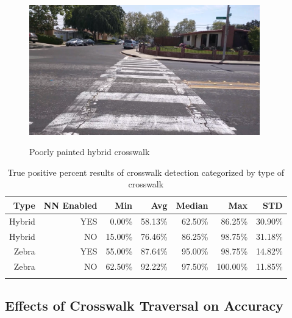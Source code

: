\documentclass[12pt]{ucthesis}
\newcommand{\captionfonts}{\small\bf\ssp}
\begin{document}
\begin{figure}[t]
\begin{center}
\includegraphics[width=10cm]{PoorlyPaintedHybrid.png}
\captionfonts
\caption[Poorly Painted Hybrid Crosswalk]{Poorly painted hybrid crosswalk}
\label{fig:poorlyPaintedHybrid}
\end{center}
\end{figure}

\clearpage

\begin{table}[t]
    \begin{longtable}{|r|r|r|r|r|r|r|}
    \hline
    Type & \multicolumn{1}{l|}{NN Enabled} & Min & Avg & Median & Max & STD \bigstrut\\
    \hline
    Hybrid & YES & 0.00\% & 58.13\% & 62.50\% & 86.25\% & 30.90\% \bigstrut\\
    \hline
    Hybrid & NO & 15.00\% & 76.46\% & 86.25\% & 98.75\% & 31.18\% \bigstrut\\
    \hline
    Zebra & YES & 55.00\% & 87.64\% & 95.00\% & 98.75\% & 14.82\% \bigstrut\\
    \hline
    Zebra & NO & 62.50\% & 92.22\% & 97.50\% & 100.00\% & 11.85\% \bigstrut\\
    \hline

    \caption{True positive percent results of crosswalk detection categorized by type of crosswalk}
    \label{tab:typeOfCwalk} 
    \end{longtable}
\end{table}

\subsection{Effects of Crosswalk Traversal on Accuracy}
\end{document}

